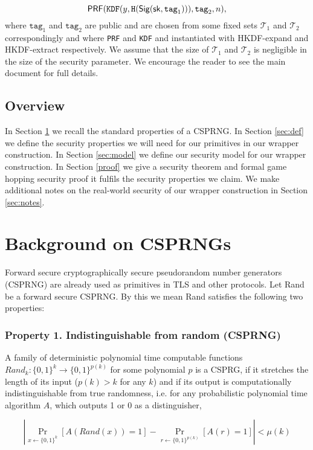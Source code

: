 \documentclass{article}
\begin{document}
$$
\mathsf{PRF}(\texttt{KDF}(y, \texttt{H}(\mathsf{Sig} (\mathsf{sk}, \texttt{tag}_1))), \texttt{tag}_2, n),
$$
where $\texttt{tag}_1$ and $\texttt{tag}_2$ are public and are chosen
from some fixed sets $\mathcal{T}_1$ and $\mathcal{T}_2$ correspondingly
and where \texttt{PRF} and \texttt{KDF} and instantiated with
HKDF-expand and HKDF-extract respectively. We assume that the size of
$\mathcal{T}_1$ and $\mathcal{T}_2$ is negligible in the size of the
security parameter.
We encourage the reader to see the main document for full details.

\subsection*{Overview}
In Section \ref{CSPRNG} we recall the standard properties of a CSPRNG. In Section \ref{sec:def} we define the security properties we will need for our primitives in our wrapper construction. In Section \ref{sec:model} we define our security model for our wrapper construction. In Section \ref{proof} we give a security theorem and formal game hopping security proof it fulfils the security properties we claim. We make additional notes on the real-world security of our wrapper construction in Section \ref{sec:notes}.


\section{Background on CSPRNGs} \label{CSPRNG}
Forward secure cryptographically secure pseudorandom number generators (CSPRNG) are already used as primitives in TLS and other protocols. Let Rand be a forward secure CSPRNG. By this we mean Rand satisfies the following two properties:

\subsubsection*{Property 1. Indistinguishable from random (CSPRNG)}

A family of deterministic polynomial time computable functions $Rand_{k} \colon \{0, 1\}^{k} \rightarrow \{0, 1 \}^{p(k)}$ for some polynomial $p$ is a  CSPRG, if it stretches the length of its input ($p(k) > k$ for any $k$) and if its output is computationally indistinguishable from true randomness, i.e. for any probabilistic polynomial time algorithm $A$, which outputs 1 or 0 as a distinguisher,

$$ |\Pr_{x\gets\{0,1\}^k}[A(Rand(x))=1] - \Pr_{r\gets\{0,1\}^{p(k)}}[A(r)=1]| < \mu(k) $$
\end{document}
